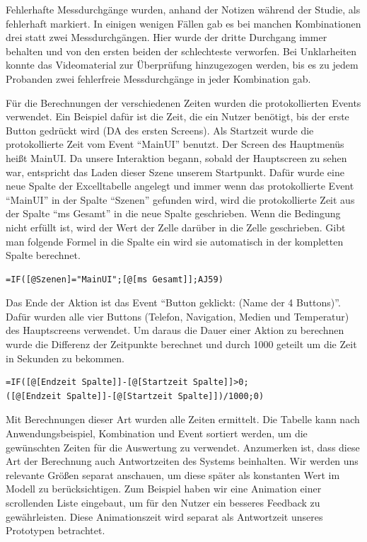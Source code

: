 Fehlerhafte Messdurchgänge wurden, anhand der Notizen während der Studie, als fehlerhaft markiert. 
In einigen wenigen Fällen gab es bei manchen Kombinationen drei statt zwei Messdurchgängen. 
Hier wurde der dritte Durchgang immer behalten und von den ersten beiden der schlechteste verworfen. 
Bei Unklarheiten konnte das Videomaterial zur Überprüfung hinzugezogen werden, bis es zu jedem Probanden zwei fehlerfreie Messdurchgänge in jeder Kombination gab. 

Für die Berechnungen der verschiedenen Zeiten wurden die protokollierten Events verwendet. 
Ein Beispiel dafür ist die Zeit, die ein Nutzer benötigt, bis der erste Button gedrückt wird (DA des ersten Screens).
Als Startzeit wurde die protokollierte Zeit vom Event "`MainUI"' benutzt. 
Der Screen des Hauptmenüs heißt MainUI.
Da unsere Interaktion begann, sobald der Hauptscreen zu sehen war, entspricht das Laden dieser Szene unserem Startpunkt. 
Dafür wurde eine neue Spalte der Excelltabelle angelegt und immer wenn das protokollierte Event "`MainUI"' in der Spalte "`Szenen"' gefunden wird, wird die protokollierte Zeit aus der Spalte "`ms Gesamt"' in die neue Spalte geschrieben. 
Wenn die Bedingung nicht erfüllt ist, wird der Wert der Zelle darüber in die Zelle geschrieben. 
Gibt man folgende Formel in die Spalte ein wird sie automatisch in der kompletten Spalte berechnet.  

\begin{lstlisting}
=IF([@Szenen]="MainUI";[@[ms Gesamt]];AJ59)
\end{lstlisting}

Das Ende der Aktion ist das Event "`Button geklickt: (Name der 4 Buttons)"'. 
Dafür wurden alle vier Buttons (Telefon, Navigation, Medien und Temperatur) des Hauptscreens verwendet. 
Um daraus die Dauer einer Aktion zu berechnen wurde die Differenz der Zeitpunkte berechnet und durch 1000 geteilt um die Zeit in Sekunden zu bekommen.

\begin{lstlisting}
=IF([@[Endzeit Spalte]]-[@[Startzeit Spalte]]>0;
([@[Endzeit Spalte]]-[@[Startzeit Spalte]])/1000;0)
\end{lstlisting}

Mit Berechnungen dieser Art wurden alle Zeiten ermittelt. Die Tabelle kann nach Anwendungsbeispiel, Kombination und Event sortiert werden, um die gewünschten Zeiten für die Auswertung zu verwendet. 
Anzumerken ist, dass diese Art der Berechnung auch Antwortzeiten des Systems beinhalten. 
Wir werden uns relevante Größen separat anschauen, um diese später als konstanten Wert im Modell zu berücksichtigen. 
Zum Beispiel haben wir eine Animation einer scrollenden Liste eingebaut, um für den Nutzer ein besseres Feedback zu gewährleisten. 
Diese Animationszeit wird separat als Antwortzeit unseres Prototypen betrachtet. 


